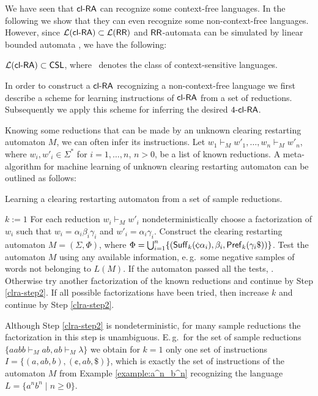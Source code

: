We have seen that $\clRA$ can recognize some context-free languages. In the following we show that they can even recognize some non-context-free languages. However, since $\calL{\clRA} \subset \calL{\RR}$ and $\RR$-automata can be simulated by linear bounded automata \citep{JMPV99}, we have the following:

\begin{corollary}
$\calL{\clRA} \subset \CSL$, where \CSL\ denotes the class of context-sensitive languages.
\end{corollary}

In order to construct a $\clRA$ recognizing a non-context-free language we first describe a scheme for learning instructions of $\clRA$ from a set of reductions. Subsequently we apply this scheme for inferring the desired $\kclRA[4]$.

Knowing some reductions that can be made by an unknown clearing restarting automaton $M$, we can often infer its instructions. Let $w_1 \vdash_M w'_1, \dots, w_n \vdash_M w'_n$, where $w_i,w'_i \in \Sigma^*$ for $i=1, \dots, n$, $n>0$, be a list of known reductions. A meta-algorithm for machine learning of unknown clearing restarting automaton can be outlined as follows:

\begin{algorithm}
\caption{Learning a clearing restarting automaton from a set of sample reductions.}
\label{algorithm:clra-learning}
\DontPrintSemicolon
\LinesNumbered
{}
$k := 1$\;
For each reduction $w_i \vdash_M w'_i$ nondeterministically choose a factorization of $w_i$ such that $w_i = \alpha_i \beta_i \gamma_i$ and $w'_i = \alpha_i \gamma_i$.\;\label{clra-step2}
Construct the clearing restarting automaton $M = (\Sigma, \Phi)$, where $\Phi = \bigcup_{i=1}^n \{(\Suff_k(\cent\alpha_i),\beta_i,\Pref_k(\gamma_i\$))\}$.\;
Test the automaton $M$ using any available information, e.\,g.\ some negative samples of words not belonging to $L(M)$.\;
If the automaton passed all the tests, . \;
Otherwise try another factorization of the known reductions and continue by Step \ref{clra-step2}. If all possible factorizations have been tried, then increase $k$ and continue by Step \ref{clra-step2}.\;
\end{algorithm}

Although Step \ref{clra-step2} is nondeterministic, for many sample reductions the factorization in this step is unambiguous. E.\,g.\ for the set of sample reductions $\{aabb \vdash_M ab, ab \vdash_M \lambda\}$ we obtain for $k=1$ only one set of instructions $I=\{(a,ab,b),(\cent,ab,\$)\}$, which is exactly the set of instructions of the automaton $M$ from Example \ref{example:a^n_b^n} recognizing the language $L = \{a^nb^n \mid n\ge 0\}$.

